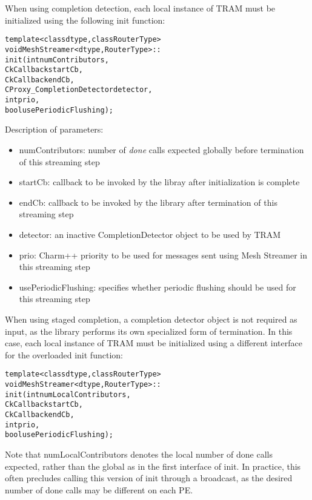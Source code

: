 When using completion detection, each local instance of TRAM
must be initialized using the following init function:

\begin{alltt}
template <class dtype, class RouterType>
void MeshStreamer<dtype, RouterType>::
init(int numContributors,
     CkCallback startCb,
     CkCallback endCb,
     CProxy_CompletionDetector detector,
     int prio,
     bool usePeriodicFlushing);
\end{alltt}

Description of parameters:

\begin{itemize}
\item numContributors: number of \emph{done} calls expected globally
  before termination of this streaming step
\item startCb: callback to be invoked by the libray after
  initialization is complete
\item endCb: callback to be invoked by the library after termination
  of this streaming step
\item detector: an inactive CompletionDetector object to be used by TRAM
\item prio: Charm++ priority to be used for messages sent using Mesh
  Streamer in this streaming step
\item usePeriodicFlushing: specifies whether periodic flushing should
  be used for this streaming step
\end{itemize}

When using staged completion, a completion detector object is not
required as input, as the library performs its own specialized form of
termination. In this case, each local instance of TRAM must
be initialized using a different interface for the overloaded init function:

\begin{alltt}
template <class dtype, class RouterType>
void MeshStreamer<dtype, RouterType>::
init(int numLocalContributors,
     CkCallback startCb,
     CkCallback endCb,
     int prio,
     bool usePeriodicFlushing);

\end{alltt}

Note that numLocalContributors denotes the local number of done calls
expected, rather than the global as in the first interface of init. In
practice, this often precludes calling this version of init through a
broadcast, as the desired number of done calls may be different on
each PE.

